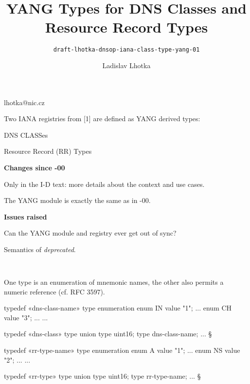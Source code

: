 

\def\prop{{\bf Proposal: }}
\def\opts{{\bf Options:}\numberList}
\let\endOpts=\endNumberList
\def\dstore#1{$\langle\hbox{#1}\rangle$}

\title{YANG Types for DNS Classes and Resource Record Types}
\subtitle{\normalSize\tt draft-lhotka-dnsop-iana-class-type-yang-01}

\author{Ladislav Lhotka}{lhotka@nic.cz}

\date [2019-03-26]

\slide[Summary]

Two IANA registries from [1] are defined as YANG derived types:

\bulletList

\item DNS CLASSes
\item Resource Record (RR) Types

\endBulletList

\medskip

{\bf Changes since -00}

\bulletList

\item Only in the I-D text: more details about the context and use cases.

\item The YANG module is exactly the same as in -00.

\endBulletList

\medskip
{\bf Issues raised}

\numberList

\item Can the YANG module and registry ever get out of sync?

\item Semantics of {\it deprecated}.

\endNumberList

\vfill
{\petit
[1]~}


One type is an enumeration of mnemonic names, the other also permits a
numeric reference (cf. RFC 3597).

{\petit


\verbatim
typedef «dns-class-name» {
  type enumeration {
    enum IN {
      value "1";
      ...
    }
    enum CH {
      value "3";
      ...
    }
    ...
  }
}

typedef «dns-class» {
  type union {
    type uint16;
    type dns-class-name;
  }
  ...
}
§

\rightColumn
 
\verbatim
typedef «rr-type-name» {
  type enumeration {
    enum A {
      value "1";
      ...
    }
    enum NS {
      value "2";
    ...
    }
    ...
  }
}

typedef «rr-type» {
  type union {
    type uint16;
    type rr-type-name;
  }
  ...
}
§}


